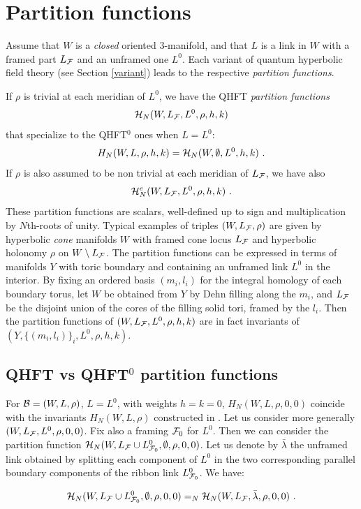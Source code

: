 \section{Partition functions}\label{CLOSED}

Assume that $W$ is a {\it closed} oriented $3$-manifold, and that $L$
is a link in $W$ with a framed part $L_{\mathcal F}$ and an unframed one
$L^0$. Each variant of quantum hyperbolic field theory (see Section
\ref{variant}) leads to the respective {\it partition functions}. 

If $\rho$ is trivial at each meridian of $L^0$, we have the
QHFT {\it partition functions} 
$$ {\mathcal H}_N(W,L_{\mathcal F},L^0,\rho,h,k)$$
that specialize to the QHFT$^0$ ones when $L=L^0$:
$$H_N(W,L,\rho,h,k)= {\mathcal H}_N(W,\emptyset,L^0,h,k) \ .$$
If $\rho$ is also assumed to be non trivial at each meridian of
$L_{\mathcal F}$, we have also
$${\mathcal H}_N^e(W,L_{\mathcal F},L^0,\rho,h,k) \ .$$ These partition functions are
scalars, well-defined up to sign and multiplication by $N$th-roots of
unity. Typical examples of triples $(W,L_{\mathcal F},\rho)$ are given by
hyperbolic {\it cone} manifolds $W$ with framed cone locus $L_{\mathcal F}$ and
hyperbolic holonomy $\rho$ on $W \setminus L_{\mathcal F}$. The partition
functions can be expressed in terms of manifolds $Y$ with toric
boundary and containing an unframed link $L^0$ in the interior. By
fixing an ordered basis $(m_i,l_i)$ for the integral homology of each
boundary torus, let $W$ be obtained from $Y$ by Dehn filling along the
$m_i$, and $L_{\mathcal F}$ be the disjoint union of the cores of the filling
solid tori, framed by the $l_i$. Then the partition functions of
$(W,L_{\mathcal F},L^0,\rho,h,k)$ are in fact invariants of
$(Y,\{(m_i,l_i)\}_i,L^0,\rho,h,k)$.

\subsection{QHFT vs QHFT$^0$ partition functions}\label{ALL}
For ${\mathcal B}=(W,L,\rho)$, $L=L^0$, with weights $h=k=0$,
$H_N(W,L,\rho,0,0)$ coincide with the invariants $H_N(W,L,\rho)$
constructed in \cite{BB1, BB2}.  Let us consider more generally
$(W,L_{\mathcal F},L^0,\rho,0,0)$.  Fix also a framing ${\mathcal F}_0$ for
$L^0$. Then we can consider the partition function
${\mathcal H}_N(W,L_{\mathcal F}\cup L^0_{{\mathcal F}_0},\emptyset,\rho,0,0)$.  Let us denote by
$\bar \lambda$ the unframed link obtained by splitting each component
of $L^0$ in the two corresponding parallel boundary components of the
ribbon link $L^0_{{\mathcal F}_0}$. We have:
\begin{prop}\label{QHFTQHI} 
$$ {\mathcal H}_N(W,L_{\mathcal F}\cup L^0_{{\mathcal F}_0},\emptyset,\rho,0,0) =_N
{\mathcal H}_N(W,L_{\mathcal F}, \bar \lambda,\rho,0,0) \ . $$ 
\end{prop}

